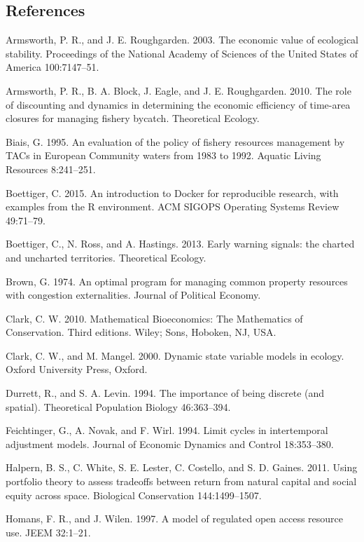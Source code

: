 \documentclass[review,12pt,author-year,titlepage]{components/elsarticle} %
\begin{document}
\begin{flushleft}
\section*{References}\label{references}

Armsworth, P. R., and J. E. Roughgarden. 2003. The economic value of
ecological stability. Proceedings of the National Academy of Sciences of
the United States of America 100:7147--51.

Armsworth, P. R., B. A. Block, J. Eagle, and J. E. Roughgarden. 2010.
The role of discounting and dynamics in determining the economic
efficiency of time-area closures for managing fishery bycatch.
Theoretical Ecology.

Biais, G. 1995. An evaluation of the policy of fishery resources
management by TACs in European Community waters from 1983 to 1992.
Aquatic Living Resources 8:241--251.

Boettiger, C. 2015. An introduction to Docker for reproducible research,
with examples from the R environment. ACM SIGOPS Operating Systems
Review 49:71--79.

Boettiger, C., N. Ross, and A. Hastings. 2013. Early warning signals:
the charted and uncharted territories. Theoretical Ecology.

Brown, G. 1974. An optimal program for managing common property
resources with congestion externalities. Journal of Political Economy.

Clark, C. W. 2010. Mathematical Bioeconomics: The Mathematics of
Conservation. Third editions. Wiley; Sons, Hoboken, NJ, USA.

Clark, C. W., and M. Mangel. 2000. Dynamic state variable models in
ecology. Oxford University Press, Oxford.

Durrett, R., and S. A. Levin. 1994. The importance of being discrete
(and spatial). Theoretical Population Biology 46:363--394.

Feichtinger, G., A. Novak, and F. Wirl. 1994. Limit cycles in
intertemporal adjustment models. Journal of Economic Dynamics and
Control 18:353--380.

Halpern, B. S., C. White, S. E. Lester, C. Costello, and S. D. Gaines.
2011. Using portfolio theory to assess tradeoffs between return from
natural capital and social equity across space. Biological Conservation
144:1499--1507.

Homans, F. R., and J. Wilen. 1997. A model of regulated open access
resource use. JEEM 32:1--21.


\end{flushleft}
\end{document}
